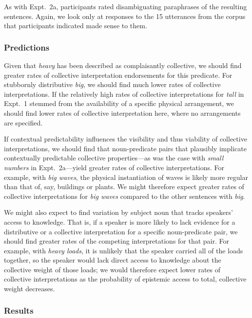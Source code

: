 \documentclass[linguex]{sp}
\begin{document}
As with Expt.~2a, participants rated disambiguating paraphrases of the resulting sentences. Again, we look only at responses to the 15 utterances from the corpus that participants indicated made sense to them.

\subsubsection{Predictions}

Given that \emph{heavy} has been described as complaisantly collective, we should find greater rates of collective interpretation endorsements for this predicate. For stubbornly distributive \emph{big}, we should find much lower rates of collective interpretations. If the relatively high rates of collective interpretations for \emph{tall} in Expt.~1 stemmed from the availability of a specific physical arrangement, we should find lower rates of collective interpretation here, where no arrangements are specified.

If contextual predictability influences the visibility and thus viability of collective interpretations, we should find that noun-predicate pairs that plausibly implicate contextually predictable collective properties---as was the case with \emph{small numbers} in Expt.~2a---yield greater rates of collective interpretations. For example, with \emph{big waves}, the physical instantiation of waves is likely more regular than that of, say, buildings or plants. We might therefore expect greater rates of collective interpretations for \emph{big waves} compared to the other sentences with \emph{big}.

We might also expect to find variation by subject noun that tracks speakers' access to knowledge. That is, if a speaker is more likely to lack evidence for a distributive or a collective interpretation for a specific noun-predicate pair, we should find greater rates of the competing interpretations for that pair. For example, with \emph{heavy loads}, it is unlikely that the speaker carried all of the loads together, so the speaker would lack direct access to knowledge about the collective weight of those loads; we would therefore expect lower rates of collective interpretations as the probability of epistemic access to total, collective weight decreases.

\subsubsection{Results}
\end{document}
